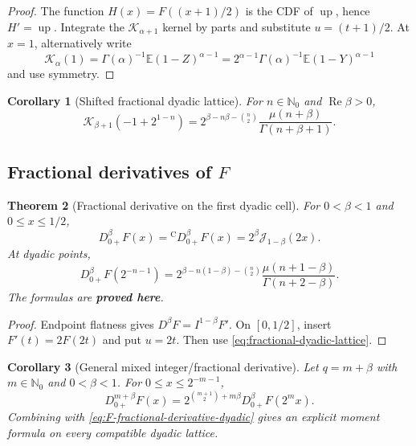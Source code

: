 \documentclass[11pt]{article}
\newcommand{\statusproved}{\textcolor{statusgreen}{\textbf{proved here}}}
\newtheorem{theorem}{Theorem}[section]
\newtheorem{corollary}[theorem]{Corollary}
\theoremstyle{definition}
\theoremstyle{remark}
\newcommand{\N}{\mathbb N}
\newcommand{\E}{\mathbb E}
\newcommand{\Up}{\operatorname{up}}
\newcommand{\Ree}{\operatorname{Re}}
\newcommand{\J}{\mathcal J}
\newcommand{\K}{\mathcal K}
\begin{document}
\begin{proof}
The function $H(x)=F((x+1)/2)$ is the CDF of $\Up$, hence $H'=\Up$.  Integrate the
$\K_{\alpha+1}$ kernel by parts and substitute $u=(t+1)/2$.  At $x=1$, alternatively write
\[
 \K_\alpha(1)=\Gamma(\alpha)^{-1}\E(1-Z)^{\alpha-1}
 =2^{\alpha-1}\Gamma(\alpha)^{-1}\E(1-Y)^{\alpha-1}
\]
and use symmetry.
\end{proof}

\begin{corollary}[Shifted fractional dyadic lattice]
For $n\in\N_0$ and $\Ree\beta>0$,
\begin{equation}
 \K_{\beta+1}(-1+2^{1-n})
 =2^{\beta-n\beta-\binom n2}
 \frac{\mu(n+\beta)}{\Gamma(n+\beta+1)}.
 \label{eq:up-fractional-lattice}
\end{equation}
\end{corollary}

\subsection{Fractional derivatives of $F$}

\begin{theorem}[Fractional derivative on the first dyadic cell]
\label{thm:F-fractional-derivative}
For $0<\beta<1$ and $0\le x\le1/2$,
\begin{equation}
 D_{0+}^{\beta}F(x)
 ={}^{\mathrm C}D_{0+}^{\beta}F(x)
 =2^\beta\J_{1-\beta}(2x).
 \label{eq:F-fractional-derivative}
\end{equation}
At dyadic points,
\begin{equation}
 D_{0+}^{\beta}F(2^{-n-1})
 =2^{\beta-n(1-\beta)-\binom n2}
 \frac{\mu(n+1-\beta)}{\Gamma(n+2-\beta)}.
 \label{eq:F-fractional-derivative-dyadic}
\end{equation}
The formulas are \statusproved.
\end{theorem}

\begin{proof}
Endpoint flatness gives $D^\beta F=I^{1-\beta}F'$.  On $[0,1/2]$, insert
$F'(t)=2F(2t)$ and put $u=2t$.  Then use \cref{eq:fractional-dyadic-lattice}.
\end{proof}

\begin{corollary}[General mixed integer/fractional derivative]
\label{cor:mixed-fractional-derivative}
Let $q=m+\beta$ with $m\in\N_0$ and $0<\beta<1$.  For
$0\le x\le2^{-m-1}$,
\begin{equation}
 D_{0+}^{m+\beta}F(x)
 =2^{\binom{m+1}{2}+m\beta}
 D_{0+}^{\beta}F(2^mx).
 \label{eq:mixed-fractional-derivative}
\end{equation}
Combining with \cref{eq:F-fractional-derivative-dyadic} gives an explicit moment formula on
every compatible dyadic lattice.
\end{corollary}
\end{document}
